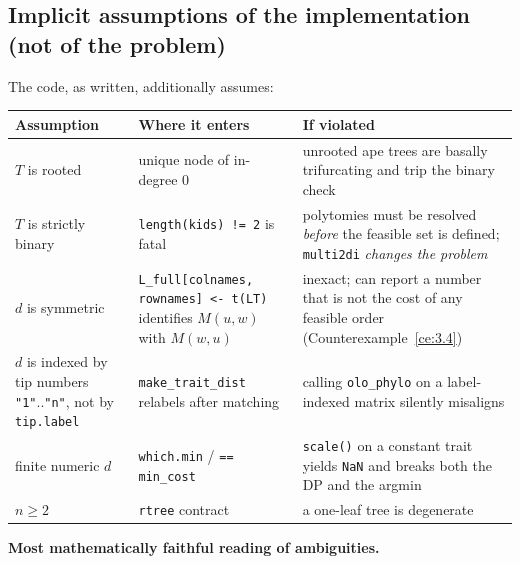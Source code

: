 \documentclass[11pt]{article}
\theoremstyle{plain}
\begin{document}
\subsection{Implicit assumptions of the implementation (not of the problem)}

The code, as written, additionally assumes:

\begin{center}
\renewcommand{\arraystretch}{1.3}
\begin{tabular}{@{}l p{7.2cm} p{6.2cm}@{}}
\toprule
Assumption & Where it enters & If violated \\
\midrule
\(T\) is rooted & unique node of in-degree 0 & unrooted ape trees are basally
trifurcating and trip the binary check \\
\(T\) is strictly binary & \texttt{length(kids) != 2} is fatal & polytomies
must be resolved \emph{before} the feasible set is defined;
\texttt{multi2di} \emph{changes the problem} \\
\(d\) is symmetric &
\texttt{L\_full[colnames, rownames] <- t(LT)} identifies \(M(u,w)\) with
\(M(w,u)\) & inexact; can report a number that is not the cost of any feasible
order (Counterexample~\ref{ce:3.4}) \\
\(d\) is indexed by tip numbers \texttt{"1"}..\texttt{"n"}, not by
\texttt{tip.label} & \texttt{make\_trait\_dist} relabels after matching &
calling \texttt{olo\_phylo} on a label-indexed matrix silently misaligns \\
finite numeric \(d\) & \texttt{which.min} / \texttt{== min\_cost} &
\texttt{scale()} on a constant trait yields \texttt{NaN} and breaks both the DP
and the argmin \\
\(n \ge 2\) & \texttt{rtree} contract & a one-leaf tree is degenerate \\
\bottomrule
\end{tabular}
\end{center}

\textbf{Most mathematically faithful reading of ambiguities.}
\end{document}
